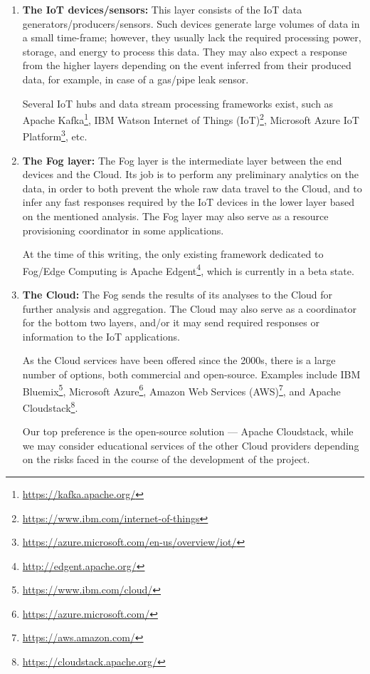 \documentclass[letterpaper]{article}
\begin{document}
 \begin{enumerate}
     \item \textbf{The IoT devices/sensors:} This layer consists of the IoT data generators/producers/sensors. Such devices generate large volumes of data in a small time-frame; however, they usually lack the required processing power, storage, and energy to process this data. They may also expect a response from the higher layers depending on the event inferred from their produced data, for example, in case of a gas/pipe leak sensor.
     
     Several IoT hubs and data stream processing frameworks exist, such as Apache Kafka\footnote{\url{https://kafka.apache.org/}}, IBM Watson Internet of Things (IoT)\footnote{\url{https://www.ibm.com/internet-of-things}}, Microsoft Azure IoT Platform\footnote{\url{https://azure.microsoft.com/en-us/overview/iot/}}, etc.

     \item \textbf{The Fog layer:} The Fog layer is the intermediate layer between the end devices and the Cloud. Its job is to perform any preliminary analytics on the data, in order to both prevent the whole raw data travel to the Cloud, and to infer any fast responses required by the IoT devices in the lower layer based on the mentioned analysis. The Fog layer may also serve as a resource provisioning coordinator in some applications.
     
     At the time of this writing, the only existing framework dedicated to Fog/Edge Computing is Apache Edgent\footnote{\url{http://edgent.apache.org/}}, which is currently in a beta state.

     \item \textbf{The Cloud:} The Fog sends the results of its analyses to the Cloud for further analysis and aggregation. The Cloud may also serve as a coordinator for the bottom two layers, and/or it may send required responses or information to the IoT applications.
     
     As the Cloud services have been offered since the 2000s, there is a large number of options, both commercial and open-source. Examples include IBM Bluemix\footnote{\url{https://www.ibm.com/cloud/}}, Microsoft Azure\footnote{\url{https://azure.microsoft.com/}}, Amazon Web Services (AWS)\footnote{\url{https://aws.amazon.com/}}, and Apache Cloudstack\footnote{\url{https://cloudstack.apache.org/}}.

     Our top preference is the open-source solution --- Apache Cloudstack, while we may consider educational services of the other Cloud providers depending on the risks faced in the course of the development of the project.
 \end{enumerate}
\end{document}
